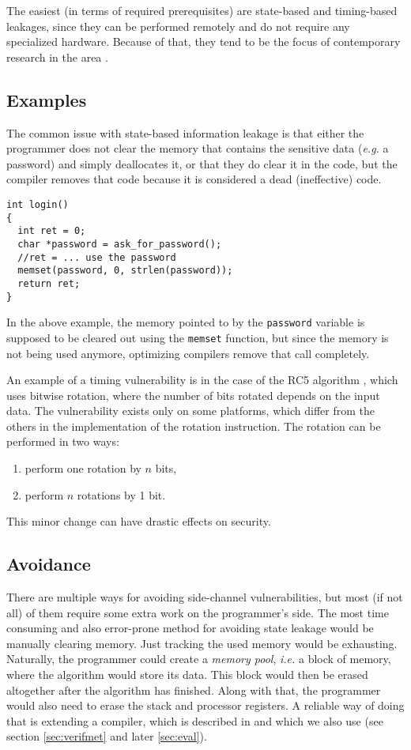 \documentclass[a4paper,10pt,openright]{memoir}
\newcommand{\ie}{\emph{i.e.}\xspace}
\newcommand{\eg}{\emph{e.g.}\xspace}
\newcommand{\term}[1]{\textit{#1}}
\newcommand{\code}[1]{\texttt{#1}}
\begin{document}
The easiest (in terms of required prerequisites) are state-based and 
timing-based leakages, since they can be performed remotely and do not 
require any specialized hardware. Because of that, they tend to be the 
focus of contemporary research in the area 
\cite{BondEtal:2017:Vale}\cite{whatyouc:2018}.

\subsection{Examples}

The common issue with state-based information leakage is that either 
the programmer does not clear the memory that contains the sensitive 
data (\eg a password) and simply deallocates it, or that they do clear 
it in the code, but the compiler removes that code because it is 
considered a dead (ineffective) code.

\begin{lstlisting}
int login()
{
  int ret = 0;
  char *password = ask_for_password();
  //ret = ... use the password
  memset(password, 0, strlen(password));
  return ret;
}
\end{lstlisting}

In the above example, the memory pointed to by the \code{password} 
variable is supposed to be cleared out using the \code{memset} 
function, but since the memory is not being used anymore, optimizing 
compilers remove that call completely\cite{whatyouc:2018}.

An example of a timing vulnerability is in the case of the RC5 
algorithm \cite{TimingRC5}, which uses bitwise rotation, where the 
number of bits rotated depends on the input data. The vulnerability 
exists only on some platforms, which differ from the others in the 
implementation of the rotation instruction. The rotation can be 
performed in two ways: 
\begin{enumerate}
\item perform one rotation by $n$ bits,
\item perform $n$ rotations by 1 bit.
\end{enumerate}
This minor change can have drastic effects on security.

\subsection{Avoidance}

There are multiple ways for avoiding side-channel vulnerabilities, but 
most (if not all) of them require some extra work on the programmer's 
side. The most time consuming and also error-prone method for avoiding 
state leakage would be manually clearing memory. Just tracking the used 
memory would be exhausting. Naturally, the programmer could create a 
\term{memory pool}, \ie a block of memory, where the algorithm would 
store its data. This block would then be erased altogether after the 
algorithm has finished. Along with that, the programmer would also need 
to erase the stack and processor registers. A reliable way of doing 
that is extending a compiler, which is described in \cite{whatyouc} and 
which we also use (see section \ref{sec:verifmet} and later 
\ref{sec:eval}).
\end{document}
